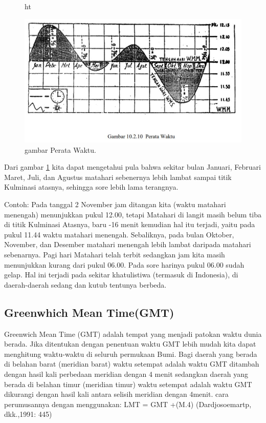 	\begin{figure}{ht}
	\centerline{\includegraphics[width=1\textwidth]{figures/sejarahwaktu_Capture.JPG}}
	\caption{gambar Perata Waktu.}
	\label{sejarahwaktu_Capture}
	\end{figure}

 Dari gambar \ref{sejarahwaktu_Capture} kita dapat mengetahui pula bahwa sekitar bulan Januari, Februari
 Maret, Juli, dan Agustus matahari sebenernya lebih lambat sampai titik Kulminasi atasnya,
 sehingga sore lebih lama terangnya.
 
	Contoh: Pada tanggal 2 November jam ditangan kita (waktu matahari menengah) 
	menunjukkan pukul 12.00, tetapi Matahari di langit masih belum tiba di titik Kulminasi 
	Atasnya, baru -16 menit kemudian hal itu terjadi, yaitu pada pukul 11.44 waktu matahari 
	menengah. Sebaliknya, pada bulan Oktober, November, dan Desember matahari menengah 
	lebih lambat daripada matahari sebenarnya. Pagi hari Matahari telah terbit sedangkan 
	jam kita masih menunjukkan kurang dari pukul 06.00. Pada sore harinya pukul 06.00 sudah
	gelap. Hal ini terjadi pada sekitar khatulistiwa (termasuk di Indonesia), 
	di daerah-daerah sedang dan kutub tentunya berbeda.
	
\subsection{Greenwhich Mean Time(GMT)}
Greenwich Mean Time (GMT) adalah tempat yang menjadi
 patokan waktu dunia berada. Jika ditentukan dengan penentuan waktu GMT lebih mudah kita
 dapat menghitung waktu-waktu di seluruh permukaan Bumi. Bagi daerah yang
 berada di belahan barat (meridian barat) waktu setempat adalah waktu GMT
 ditambah dengan hasil kali perbedaan meridian dengan 4 menit sedangkan daerah
 yang berada di belahan timur (meridian timur) waktu setempat adalah waktu GMT
 dikurangi dengan hasil kali antara selisih meridian dengan 4menit. 
 cara perumusannya dengan menggunakan:
					LMT = GMT +(M.4)
			(Dardjosoemartp, dkk.,1991: 445)
			
